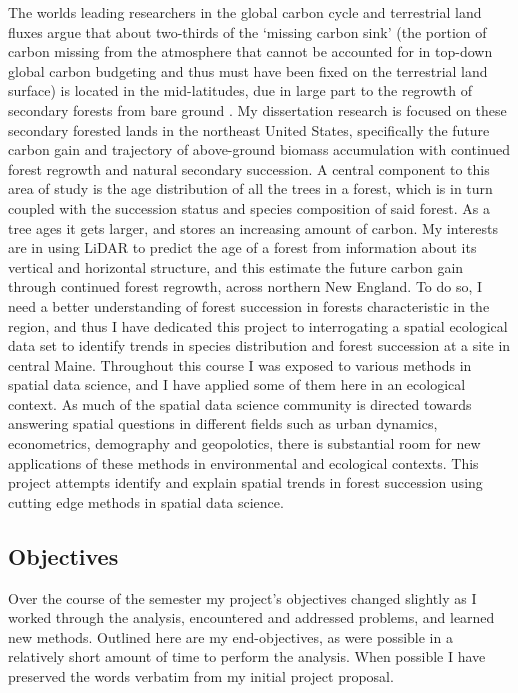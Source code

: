 \documentclass[12pt,a4paper]{article}
\begin{document}
The worlds leading researchers in the global carbon cycle and terrestrial land fluxes argue that about two-thirds of the `missing carbon sink' (the portion of carbon missing from the atmosphere that cannot be accounted for in top-down global carbon budgeting and thus must have been fixed on the terrestrial land surface) is located in the mid-latitudes, due in large part to the regrowth of secondary forests from bare ground \citep{schimel2015,houghton2018}.  My dissertation research is focused on these secondary forested lands in the northeast United States, specifically the future carbon gain and trajectory of above-ground biomass accumulation with continued forest regrowth and natural secondary succession.  A central component to this area of study is the age distribution of all the trees in a forest, which is in turn coupled with the succession status and species composition of said forest.  As a tree ages it gets larger, and stores an increasing amount of carbon.  My interests are in using LiDAR to predict the age of a forest from information about its vertical and horizontal structure, and this estimate the future carbon gain through continued forest regrowth, across northern New England.  To do so, I need a better understanding of forest succession in forests characteristic in the region, and thus I have dedicated this project to interrogating a spatial ecological data set to identify trends in species distribution and forest succession at a site in central Maine.  Throughout this course I was exposed to various methods in spatial data science, and I have applied some of them here in an ecological context.  As much of the spatial data science community is directed towards answering spatial questions in different fields such as urban dynamics, econometrics, demography and geopolotics, there is substantial room for new applications of these methods in environmental and ecological contexts.  This project attempts identify and explain spatial trends in forest succession using cutting edge methods in spatial data science.  

\subsection{Objectives}

Over the course of the semester my project's objectives changed slightly as I worked through the analysis, encountered and addressed problems, and learned new methods.  Outlined here are my end-objectives, as were possible in a relatively short amount of time to perform the analysis.  When possible I have preserved the words verbatim from my initial project proposal.
\end{document}
